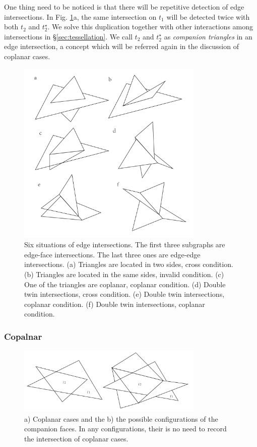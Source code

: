 \documentclass[10pt,journal,compsoc]{IEEEtran}
\begin{document}
One thing need to be noticed is that there will be repetitive detection of edge intersections. In Fig. \ref{fig:twin}a, the same intersection on $t_1$ will be detected twice with both $t_2$ and $t_2^{\star}$. We solve this duplication together with other interactions among intersections in \S\ref{sec:tessellation}. We call $t_2$ and $t_2^{\star}$ as \emph{companion triangles} in an edge intersection, a concept which will be referred again in the discussion of coplanar cases.

\begin{figure}[t]
\centering
\includegraphics[width=3.5in]{twin}
\caption{Six situations of edge intersections. The first three subgraphs are edge-face intersections. The last three ones are edge-edge intersections. (a) Triangles are located in two sides, cross condition. (b) Triangles are located in the same sides, invalid condition. (c) One of the triangles are coplanar, coplanar condition. (d) Double twin intersections, cross condition. (e) Double twin intersections, coplanar condition. (f) Double twin intersections, coplanar condition.}
\label{fig:twin}
\end{figure}


\subsubsection{Copalnar}

\begin{figure}[t]
\centering
\includegraphics[width=3.5in]{coplanar}
\caption{a) Coplanar cases and the b) the possible configurations of the companion faces. In any configurations, their is no need to record the intersection of coplanar cases.}
\label{fig:coplanar}
\end{figure}
\end{document}
